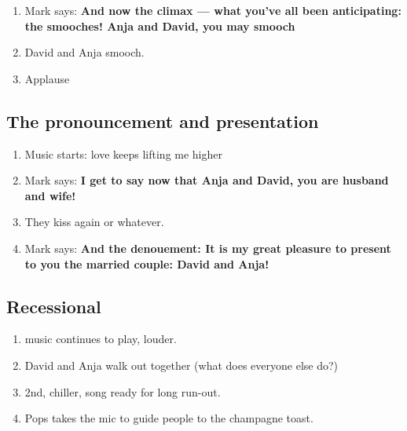\begin{enumerate}
\def\labelenumi{\arabic{enumi}.}
\tightlist
\item
  Mark says: \textbf{And now the climax --- what you've all been
  anticipating: the smooches! Anja and David, you may smooch}
\item
  David and Anja smooch.
\item
  Applause
\end{enumerate}

\hypertarget{the-pronouncement-and-presentation}{%
\subsection{The pronouncement and
presentation}\label{the-pronouncement-and-presentation}}

\begin{enumerate}
\def\labelenumi{\arabic{enumi}.}
\tightlist
\item
  Music starts: love keeps lifting me higher
\item
  Mark says: \textbf{I get to say now that Anja and David, you are
  husband and wife!}
\item
  They kiss again or whatever.
\item
  Mark says: \textbf{And the denouement: It is my great pleasure to
  present to you the married couple: David and Anja!}
\end{enumerate}

\hypertarget{recessional}{%
\subsection{Recessional}\label{recessional}}

\begin{enumerate}
\def\labelenumi{\arabic{enumi}.}
\tightlist
\item
  music continues to play, louder.
\item
  David and Anja walk out together (what does everyone else do?)
\item
  2nd, chiller, song ready for long run-out.
\item
  Pops takes the mic to guide people to the champagne toast.
\end{enumerate}
